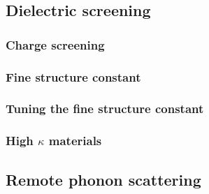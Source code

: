 \documentclass[../Matt_Gebert_Honours_Thesis.tex]{subfiles}
\begin{document}
	\subsection{Dielectric screening}
	\subsubsection{Charge screening}
	\subsubsection{Fine structure constant}
	\subsubsection{Tuning the fine structure constant}
	\subsubsection{High $\kappa$ materials}
	\subsection{Remote phonon scattering}
	
	\section{}
	
	
	
\end{document}
